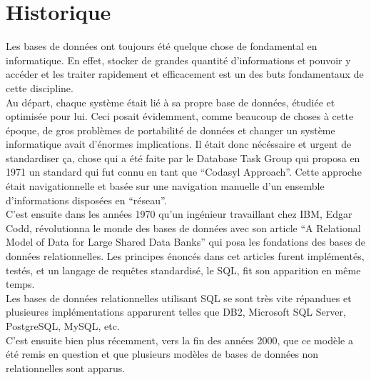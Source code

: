 \documentclass[11pt]{article}
\begin{document}
\section{Historique}
Les bases de données ont toujours été quelque chose de fondamental en informatique. En effet, stocker de grandes quantité d'informations et pouvoir y accéder et les traiter rapidement et efficacement est un des buts fondamentaux de cette discipline. \\
Au départ, chaque système était lié à sa propre base de données, étudiée et optimisée pour lui. Ceci posait évidemment, comme beaucoup de choses à cette époque, de gros problèmes de portabilité de données et changer un système informatique avait d'énormes implications. Il était donc nécéssaire et urgent de standardiser ça, chose qui a été faite par le Database Task Group qui proposa en 1971 un standard qui fut connu en tant que ``Codasyl Approach''. Cette approche était navigationnelle et basée sur une navigation manuelle d'un ensemble d'informations disposées en ``réseau''. \\
C'est ensuite dans les années 1970 qu'un ingénieur travaillant chez IBM, Edgar Codd, révolutionna le monde des bases de données avec son article ``A Relational Model of Data for Large Shared Data Banks'' qui posa les fondations des bases de données relationnelles. Les principes énoncés dans cet articles furent implémentés, testés, et un langage de requêtes standardisé, le SQL, fit son apparition en même temps. \\
Les bases de données relationnelles utilisant SQL se sont très vite répandues et plusieures implémentations apparurent telles que DB2, Microsoft SQL Server, PostgreSQL, MySQL, etc. \\
C'est ensuite bien plus récemment, vers la fin des années 2000, que ce modèle a été remis en question et que plusieurs modèles de bases de données non relationnelles sont apparus.
\end{document}
